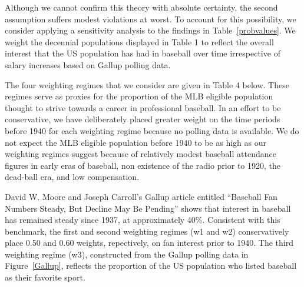 \documentclass[11pt]{article}\usepackage[]{graphicx}\usepackage[]{color}
\begin{document}
Although we cannot confirm this theory with absolute certainty, the second 
assumption suffers modest violations at worst.  To account for this 
possibility, we consider applying a sensitivity analysis to the findings
in Table~\ref{probvalues}.  We weight the 
decennial populations displayed in Table 1 to reflect the overall interest 
that the US population has had in baseball over time irrespective of salary 
increases based on Gallup polling data.  

The four weighting regimes that we consider 
are given in Table 4 below.  %
These regimes serve as proxies for the proportion of the 
MLB eligible population thought to strive towards a career in professional 
baseball.  
In an effort to be conservative, we have deliberately placed greater weight 
on the time periods before 1940 for each weighting regime because no polling 
data is available.
We do not expect the MLB eligible population before 1940 to be as 
high as our weighting regimes suggest because of 
relatively modest baseball attendance figures in early eras of baseball,  
non existence of the radio prior to 1920, 
the dead-ball era,
and low compensation.  


David W. Moore and Joseph Carroll's Gallup article entitled 
``Baseball Fan Numbers Steady, But Decline May Be Pending'' shows that 
interest in baseball has remained steady since 1937, at approximately
40\%.  %
Consistent with this benchmark, the first and second weighting regimes 
(w1 and w2) conservatively place 0.50 and 0.60 weights, repectively, 
on fan interest prior to 1940.  %
The third weighting regime (w3), constructed from the Gallup polling data in 
Figure~\ref{Gallup}, reflects the proportion of the US population who 
listed baseball as their favorite sport.  
\end{document}
